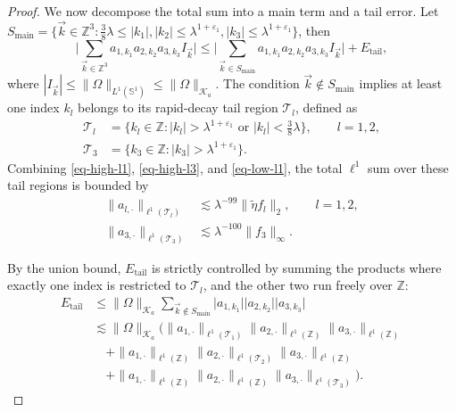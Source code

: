 \documentclass[11pt]{amsart}
\begin{document}
\begin{proof}
	We now decompose the total sum into a main term and a tail error. Let $S_{\text{main}} = \{ \vec{k} \in \mathbb{Z}^3 : \frac{3}{8}\lambda \le |k_1|, |k_2| \le \lambda^{1+\varepsilon_1}, |k_3| \le \lambda^{1+\varepsilon_1} \}$, then
	\begin{equation}\label{eqmain-plus-errors}
		\Big| \sum_{\vec{k} \in \mathbb{Z}^3} a_{1,k_1}a_{2,k_2}a_{3,k_3}I_{\vec k} \Big| \le \Big| \sum_{\vec{k} \in S_{\text{main}}} a_{1,k_1}a_{2,k_2}a_{3,k_3}I_{\vec k} \Big| + E_{\text{tail}},
	\end{equation}
	where $|I_{\vec k}| \le \|\Omega\|_{L^1(\mathbb S^1)} \le \|\Omega\|_{\mathcal K_a}$. The condition $\vec{k} \notin S_{\text{main}}$ implies at least one index $k_l$ belongs to its rapid-decay tail region $\mathcal{T}_l$, defined as
	\begin{align*}
		\mathcal{T}_l &= \{k_l \in \mathbb{Z} : |k_l| > \lambda^{1+\varepsilon_1} \text{ or } |k_l| < \frac{3}{8}\lambda\}, \qquad l=1,2, \\
		\mathcal{T}_3 &= \{k_3 \in \mathbb{Z} : |k_3| > \lambda^{1+\varepsilon_1}\}.
	\end{align*}
	Combining \eqref{eq-high-l1}, \eqref{eq-high-l3}, and \eqref{eq-low-l1}, the total $\ell^1$ sum over these tail regions is bounded by
	\begin{align}
		\|a_{l, \cdot}\|_{\ell^1(\mathcal{T}_l)} &\lesssim \lambda^{-99}\|\widetilde\eta f_l\|_2, \qquad l=1,2, \label{eq-tail-total-12} \\
		\|a_{3, \cdot}\|_{\ell^1(\mathcal{T}_3)} &\lesssim \lambda^{-100}\|f_3\|_\infty. \label{eq-tail-total-3}
	\end{align}
	
	By the union bound, $E_{\text{tail}}$ is strictly controlled by summing the products where exactly one index is restricted to $\mathcal{T}_l$, and the other two run freely over $\mathbb{Z}$:
	\begin{align*}
		E_{\text{tail}} &\le \|\Omega\|_{\mathcal K_a} \sum_{\vec{k} \notin S_{\text{main}}} \big|a_{1,k_1}\big| \big|a_{2,k_2}\big| \big|a_{3,k_3}\big| \\
		&\lesssim \|\Omega\|_{\mathcal K_a} \Big( \|a_{1, \cdot}\|_{\ell^1(\mathcal{T}_1)} \|a_{2, \cdot}\|_{\ell^1(\mathbb{Z})} \|a_{3, \cdot}\|_{\ell^1(\mathbb{Z})} \\
		&\quad + \|a_{1, \cdot}\|_{\ell^1(\mathbb{Z})} \|a_{2, \cdot}\|_{\ell^1(\mathcal{T}_2)} \|a_{3, \cdot}\|_{\ell^1(\mathbb{Z})} \\
		&\quad + \|a_{1, \cdot}\|_{\ell^1(\mathbb{Z})} \|a_{2, \cdot}\|_{\ell^1(\mathbb{Z})} \|a_{3, \cdot}\|_{\ell^1(\mathcal{T}_3)} \Big).
	\end{align*}
	

\end{proof}
\end{document}
